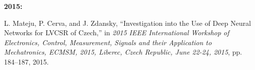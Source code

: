 \documentclass[FM,noheader,EN]{tulthesis}
\begin{document}
	\noindent \textbf{2015:}
	\begin{enumerate}[leftmargin=*,resume]
		L. Mateju, P. Cerva, and J. Zdansky, “Investigation into the Use of Deep Neural 
		Networks for LVCSR of Czech,” in \textit{2015 IEEE International Workshop of Electronics, 
		Control, Measurement, Signals and their Application to Mechatronics, ECMSM, 
		2015, Liberec, Czech Republic, June 22-24, 2015}, pp. 184–187, 2015.
	\end{enumerate}
\end{document}
